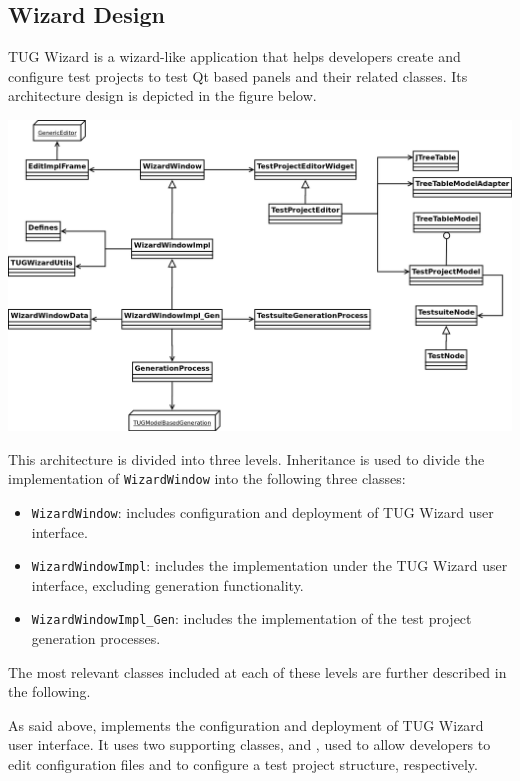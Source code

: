 
\subsection{Wizard Design}

TUG Wizard is a wizard-like application that helps developers create and
configure test projects to test Qt based panels and their related classes.
%
Its architecture design is depicted in the figure below.

\vspace{2ex}
\includegraphics[width=.99\textwidth]{images/diag/tug_wizard_classdiag.png}
\vspace{2ex}

This architecture is divided into three levels. Inheritance is used to
divide the implementation of {\tt WizardWindow} into the following three
classes:
%
\begin{itemize}
\item {\tt WizardWindow}: includes configuration and deployment of TUG
  Wizard user interface.
%
\item {\tt WizardWindowImpl}: includes the implementation under the TUG
  Wizard user interface, excluding generation functionality.
%
\item {\tt WizardWindowImpl\_Gen}: includes the implementation of the
  test project generation processes.
\end{itemize}

The most relevant classes included at each of these levels are further
described in the following.

\newpage


As said above,  implements the configuration and
deployment of TUG Wizard user interface. It uses two supporting classes,
 and , used to allow
developers to edit configuration files and to configure a test project
structure, respectively.  


